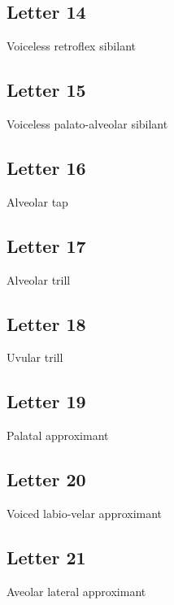 \documentclass{article}
\newcommand{\letter}[1]{\begin{center}\resizebox{1cm}{!}{\texttt{[image: \#1]}}\end{center}}
\begin{document}
\letter{letters/consonants/13.JPG}

\subsection{Letter 14}
Voiceless retroflex sibilant

\letter{letters/consonants/14.JPG}

\subsection{Letter 15}
Voiceless palato-alveolar sibilant

\letter{letters/consonants/15.JPG}

\subsection{Letter 16}
Alveolar tap

\letter{letters/consonants/16.JPG}

\subsection{Letter 17}
Alveolar trill

\letter{letters/consonants/17.JPG}

\subsection{Letter 18}
Uvular trill

\letter{letters/consonants/18.JPG}

\subsection{Letter 19}
Palatal approximant

\letter{letters/consonants/19.JPG}

\subsection{Letter 20}
Voiced labio-velar approximant

\letter{letters/consonants/20.JPG}

\subsection{Letter 21}
Aveolar lateral approximant

\letter{letters/consonants/21.JPG}
\end{document}
